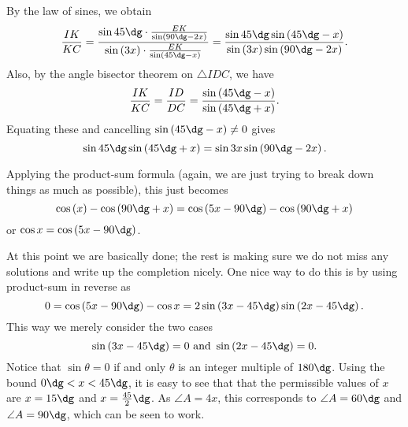 By the law of sines, we obtain
\[ \frac{IK}{KC} = \frac%
  {\sin 45\dg \cdot \frac{EK}{\sin \left( 90\dg - 2x \right)}}%
  {\sin \left( 3x \right) \cdot \frac{EK}{\sin \left( 45\dg-x \right)}}
  = \frac{\sin 45\dg \sin \left( 45\dg - x \right)}%
  {\sin \left( 3x \right) \sin \left( 90\dg - 2x \right)}. \]
Also, by the angle bisector theorem on $\triangle IDC$,
we have
\[ \frac{IK}{KC} = \frac{ID}{DC}
  = \frac{\sin \left( 45\dg-x \right)}{\sin\left( 45\dg+x \right)}. \]
Equating these and cancelling $\sin \left( 45\dg-x \right) \neq 0$ gives
\[ \sin 45\dg \sin \left( 45\dg + x \right)
  = \sin 3x \sin \left( 90\dg - 2x \right). \]

Applying the product-sum formula
(again, we are just trying to break down things as much as possible),
this just becomes
\[ \cos\left( x \right) - \cos \left( 90\dg + x \right)
  = \cos \left( 5x-90\dg \right) - \cos \left( 90\dg+x \right) \]
or $\cos x = \cos \left( 5x-90\dg \right)$.

At this point we are basically done;
the rest is making sure we do not miss any solutions
and write up the completion nicely.
One nice way to do this is by using product-sum in reverse as
\[ 0 = \cos \left( 5x-90\dg \right) - \cos x
  = 2 \sin \left( 3x - 45\dg \right) \sin \left( 2x-45\dg \right). \]
This way we merely consider the two cases
\[ \sin \left( 3x-45\dg \right) = 0 \text{ and }
  \sin \left( 2x - 45\dg \right) = 0. \]
Notice that $\sin\theta = 0$ if and only $\theta$
is an integer multiple of $180\dg$.
Using the bound $0\dg < x < 45\dg$,
it is easy to see that that the permissible values of $x$
are $x = 15\dg$ and $x = \frac{45}{2}\dg$.
As $\angle A = 4x$, this corresponds to $\angle A = 60\dg$
and $\angle A = 90\dg$, which can be seen to work.
\pagebreak